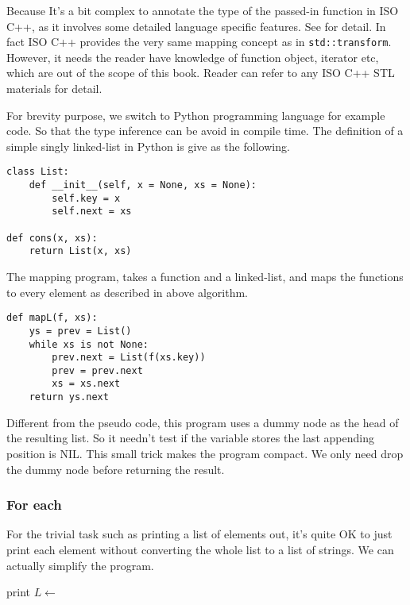 \documentclass{article}
\begin{document}
Because It's a bit complex to annotate the type of the passed-in function in ISO C++, as it
involves some detailed language specific features. See \cite{sgi-stl-transform} for detail. 
In fact ISO C++ provides the very same mapping concept as in \verb|std::transform|. However, 
it needs the reader have knowledge of function object, iterator etc, which are out of the
scope of this book. Reader can refer to any ISO C++ STL materials for detail.

For brevity purpose, we switch to Python programming language for example code. So that the type inference
can be avoid in compile time. The definition of a simple singly linked-list in Python is give as the 
following.

\lstset{language=Python}
\begin{lstlisting}
class List:
    def __init__(self, x = None, xs = None):
        self.key = x
        self.next = xs

def cons(x, xs):
    return List(x, xs)
\end{lstlisting}

The mapping program, takes a function and a linked-list, and maps the functions to every element as described
in above algorithm.

\begin{lstlisting}
def mapL(f, xs):
    ys = prev = List()
    while xs is not None:
        prev.next = List(f(xs.key))
        prev = prev.next
        xs = xs.next
    return ys.next
\end{lstlisting}

Different from the pseudo code, this program uses a dummy node as the head of the resulting list. So it needn't
test if the variable stores the last appending position is NIL. This small trick makes the program compact. 
We only need drop the dummy node before returning the result.

\subsubsection{For each}

For the trivial task such as printing a list of elements out, it's quite OK to just print each element without 
converting the whole list to a list of strings. We can actually simplify the program.

\begin{algorithmic}
    \State print 
    \State $L \gets$ 
  \EndWhile
\EndFunction
\end{algorithmic}
\end{document}

